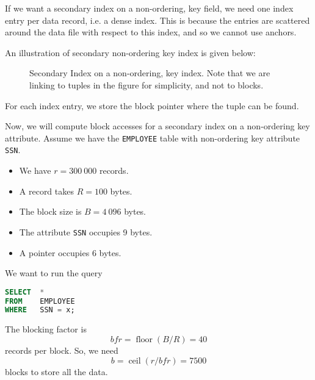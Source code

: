 \documentclass[a4paper, openany]{memoir}
\begin{document}
If we want a secondary index on a non-ordering, key field, we need one index entry per data record, i.e. a dense index. This is because the entries are scattered around the data file with respect to this index, and so we cannot use anchors.

An illustration of secondary non-ordering key index is given below:
\begin{figure}[H]
    \centering
    \caption{Secondary Index on a non-ordering, key index. Note that we are linking to tuples in the figure for simplicity, and not to blocks.}
\end{figure}
\noindent For each index entry, we store the block pointer where the tuple can be found.

Now, we will compute block accesses for a secondary index on a non-ordering key attribute. Assume we have the \texttt{EMPLOYEE} table with non-ordering key attribute \texttt{SSN}. 
\begin{itemize}
    \item We have $r = 300 \ 000$ records.
    \item A record takes $R = 100$ bytes.
    \item The block size is $B = 4 \ 096$ bytes.
    \item The attribute \texttt{SSN} occupies 9 bytes.
    \item A pointer occupies 6 bytes.
\end{itemize}
We want to run the query
\begin{lstlisting}[language=SQL]
SELECT  *
FROM    EMPLOYEE
WHERE   SSN = x;
\end{lstlisting}
The blocking factor is
\[\textit{bfr} = \operatorname{floor}(B/R) = 40\]
records per block. So, we need
\[b = \operatorname{ceil}(r/\textit{bfr}) = 7500\]
blocks to store all the data.
\end{document}
